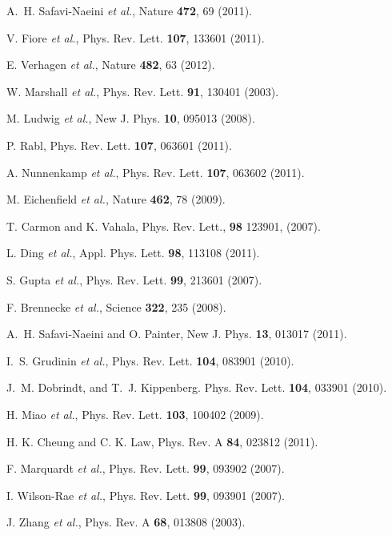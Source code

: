 \begin{thebibliography}{1}
A.~H. Safavi-Naeini {\it et al.}, 
Nature {\bf 472}, 69 (2011).

V. Fiore {\it et al.},   
Phys. Rev. Lett. {\bf 107}, 133601 (2011). 

E. Verhagen {\it et al.}, 
Nature {\bf 482}, 63 (2012). 

W. Marshall {\it et al.}, 
Phys. Rev. Lett. {\bf  91}, 130401 (2003). 

M. Ludwig {\it et al.}, 
New J. Phys. {\bf 10}, 095013 (2008). 

P. Rabl, 
Phys. Rev. Lett. {\bf 107}, 063601 (2011).

A. Nunnenkamp {\it et al.}, 
Phys. Rev. Lett. {\bf 107}, 063602 (2011). 


M. Eichenfield {\it et al.},  
Nature {\bf 462}, 78  (2009).


T. Carmon and K. Vahala, 
Phys. Rev. Lett., {\bf 98} 123901, (2007). 

L. Ding {\it et al.}, 
Appl. Phys. Lett. {\bf 98}, 113108 (2011).


S. Gupta {\it et al.},  
Phys. Rev. Lett. {\bf 99}, 213601 (2007).

F. Brennecke {\it et al.},  
Science {\bf 322}, 235 (2008).

A.~H. Safavi-Naeini and O. Painter, 
New J. Phys.  {\bf 13},  013017  (2011).


I.~S. Grudinin {\it et al.},  
Phys. Rev. Lett. {\bf 104}, 083901 (2010).

J.~M. Dobrindt, 
and T.~J. Kippenberg. 
Phys. Rev. Lett. {\bf 104}, 033901 (2010). 

H. Miao {\it et al.}, 
Phys. Rev. Lett. {\bf 103}, 100402 (2009). 

H. K. Cheung and C. K. Law, 
Phys. Rev. A {\bf 84}, 023812 (2011).

F. Marquardt {\it et al.}, 
Phys. Rev. Lett. \textbf{99}, 093902 (2007). 

I. Wilson-Rae {\it et al.}, 
Phys. Rev. Lett. \textbf{99}, 093901 (2007).

J.  Zhang {\it et al.}, 
Phys. Rev. A {\bf 68}, 013808 (2003).


\end{thebibliography}
